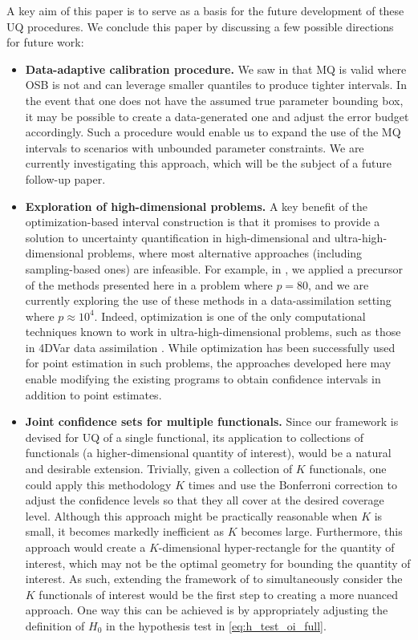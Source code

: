 \documentclass[11pt]{article}
\numberwithin{equation}{section}
\numberwithin{figure}{section}
\begin{document}
A key aim of this paper is to serve as a basis for the future development of these UQ procedures. 
We conclude this paper by discussing a few possible directions for future work:

\begin{itemize}[leftmargin=7mm]
    \item \textbf{Data-adaptive calibration procedure.}
    We saw in  that MQ is valid where OSB is not and can leverage smaller quantiles to produce tighter intervals. 
    In the event that one does not have the assumed true parameter bounding box, it may be possible to create a data-generated one and adjust the error budget accordingly. 
    Such a procedure would enable us to expand the use of the MQ intervals to scenarios with unbounded parameter constraints. 
    We are currently investigating this approach, which will be the subject of a future follow-up paper.

    \item \textbf{Exploration of high-dimensional problems.} 
    A key benefit of the optimization-based interval construction is that it promises to provide a solution to uncertainty quantification in high-dimensional and ultra-high-dimensional problems, where most alternative approaches (including sampling-based ones) are infeasible. 
    For example, in \cite{stanley_unfolding}, we applied a precursor of the methods presented here in a problem where $p=80$, and we are currently exploring the use of these methods in a data-assimilation setting where $p \approx 10^4$. 
    Indeed, optimization is one of the only computational techniques known to work in ultra-high-dimensional problems, such as those in 4DVar data assimilation \cite{kalmikov,ecco,liu_2016}. 
    While optimization has been successfully used for point estimation in such problems, the approaches developed here may enable modifying the existing programs to obtain confidence intervals in addition to point estimates.
    
    \item \textbf{Joint confidence sets for multiple functionals.}
    Since our framework is devised for UQ of a single functional,
    its application to collections of functionals (a higher-dimensional quantity of interest), would be a natural and desirable extension. 
    Trivially, given a collection of $K$ functionals, one could apply this methodology $K$ times and use the Bonferroni correction to adjust the confidence levels so that they all cover at the desired coverage level. 
    Although this approach might be practically reasonable when $K$ is small, it becomes markedly inefficient as $K$ becomes large. 
    Furthermore, this approach would create a $K$-dimensional hyper-rectangle for the quantity of interest, which may not be the optimal geometry for bounding the quantity of interest. 
    As such, extending the framework of  to simultaneously consider the $K$ functionals of interest would be the first step to creating a more nuanced approach.
    One way this can be achieved is by appropriately adjusting the definition of $H_0$ in the hypothesis test in \eqref{eq:h_test_oi_full}.
    

\end{itemize}
\end{document}
